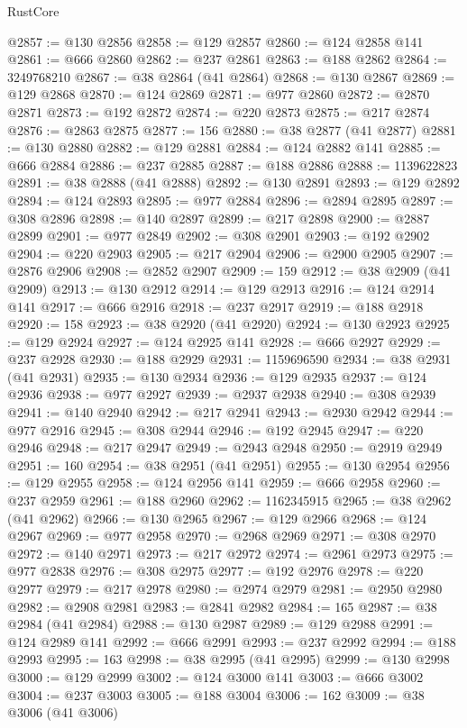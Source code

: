 \begin{lexlean}{RustCore}
\begin{coremodule}
@2857 := @130 @2856
@2858 := @129 @2857
@2860 := @124 @2858 @141
@2861 := @666 @2860
@2862 := @237 @2861
@2863 := @188 @2862
@2864 := 3249768210
@2867 := @38 @2864 (@41 @2864)
@2868 := @130 @2867
@2869 := @129 @2868
@2870 := @124 @2869
@2871 := @977 @2860
@2872 := @2870 @2871
@2873 := @192 @2872
@2874 := @220 @2873
@2875 := @217 @2874
@2876 := @2863 @2875
@2877 := 156
@2880 := @38 @2877 (@41 @2877)
@2881 := @130 @2880
@2882 := @129 @2881
@2884 := @124 @2882 @141
@2885 := @666 @2884
@2886 := @237 @2885
@2887 := @188 @2886
@2888 := 1139622823
@2891 := @38 @2888 (@41 @2888)
@2892 := @130 @2891
@2893 := @129 @2892
@2894 := @124 @2893
@2895 := @977 @2884
@2896 := @2894 @2895
@2897 := @308 @2896
@2898 := @140 @2897
@2899 := @217 @2898
@2900 := @2887 @2899
@2901 := @977 @2849
@2902 := @308 @2901
@2903 := @192 @2902
@2904 := @220 @2903
@2905 := @217 @2904
@2906 := @2900 @2905
@2907 := @2876 @2906
@2908 := @2852 @2907
@2909 := 159
@2912 := @38 @2909 (@41 @2909)
@2913 := @130 @2912
@2914 := @129 @2913
@2916 := @124 @2914 @141
@2917 := @666 @2916
@2918 := @237 @2917
@2919 := @188 @2918
@2920 := 158
@2923 := @38 @2920 (@41 @2920)
@2924 := @130 @2923
@2925 := @129 @2924
@2927 := @124 @2925 @141
@2928 := @666 @2927
@2929 := @237 @2928
@2930 := @188 @2929
@2931 := 1159696590
@2934 := @38 @2931 (@41 @2931)
@2935 := @130 @2934
@2936 := @129 @2935
@2937 := @124 @2936
@2938 := @977 @2927
@2939 := @2937 @2938
@2940 := @308 @2939
@2941 := @140 @2940
@2942 := @217 @2941
@2943 := @2930 @2942
@2944 := @977 @2916
@2945 := @308 @2944
@2946 := @192 @2945
@2947 := @220 @2946
@2948 := @217 @2947
@2949 := @2943 @2948
@2950 := @2919 @2949
@2951 := 160
@2954 := @38 @2951 (@41 @2951)
@2955 := @130 @2954
@2956 := @129 @2955
@2958 := @124 @2956 @141
@2959 := @666 @2958
@2960 := @237 @2959
@2961 := @188 @2960
@2962 := 1162345915
@2965 := @38 @2962 (@41 @2962)
@2966 := @130 @2965
@2967 := @129 @2966
@2968 := @124 @2967
@2969 := @977 @2958
@2970 := @2968 @2969
@2971 := @308 @2970
@2972 := @140 @2971
@2973 := @217 @2972
@2974 := @2961 @2973
@2975 := @977 @2838
@2976 := @308 @2975
@2977 := @192 @2976
@2978 := @220 @2977
@2979 := @217 @2978
@2980 := @2974 @2979
@2981 := @2950 @2980
@2982 := @2908 @2981
@2983 := @2841 @2982
@2984 := 165
@2987 := @38 @2984 (@41 @2984)
@2988 := @130 @2987
@2989 := @129 @2988
@2991 := @124 @2989 @141
@2992 := @666 @2991
@2993 := @237 @2992
@2994 := @188 @2993
@2995 := 163
@2998 := @38 @2995 (@41 @2995)
@2999 := @130 @2998
@3000 := @129 @2999
@3002 := @124 @3000 @141
@3003 := @666 @3002
@3004 := @237 @3003
@3005 := @188 @3004
@3006 := 162
@3009 := @38 @3006 (@41 @3006)

\end{coremodule}
\end{lexlean}
